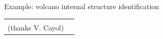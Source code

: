 \begin{frame}{}
\begin{exampleblock}{Example: volcano internal structure identification}
\begin{center}
\begin{tabular}{cc}
\begin{minipage}[b]{0.35\textwidth}
\begin{center}
\vspace{1.0cm}
{\tiny Finite elements mesh of the Piton de la Fournaise. \\
(thanks V. Cayol)}
\end{center}
\end{minipage} 
\\
\end{tabular}
\end{center}
\end{exampleblock}
\end{frame}






